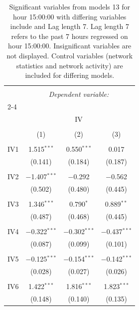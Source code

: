 
\begin{table}[!htbp] \centering 
  \caption{Significant variables from models 13 for hour 15:00:00 with differing variables include 
                               and Lag length 7. Lag length 7 refers to the past 7 hours regressed on hour 15:00:00. 
                               Insignificant variables are not displayed. 
                               Control variables (network statistics and network activity) are 
                               included for differing models.} 
  \label{IVmodels2_t_hourlagged2} 
\scriptsize 
\begin{tabular}{@{\extracolsep{5pt}}lccc} 
\\[-1.8ex]\hline 
\hline \\[-1.8ex] 
 & \multicolumn{3}{c}{\textit{Dependent variable:}} \\ 
\cline{2-4} 
\\[-1.8ex] & \multicolumn{3}{c}{IV} \\ 
\\[-1.8ex] & (1) & (2) & (3)\\ 
\hline \\[-1.8ex] 
 IV1 & 1.515$^{***}$ & 0.550$^{***}$ & 0.017 \\ 
  & (0.141) & (0.184) & (0.187) \\ 
  & & & \\ 
 IV2 & $-$1.407$^{***}$ & $-$0.292 & $-$0.562 \\ 
  & (0.502) & (0.480) & (0.445) \\ 
  & & & \\ 
 IV3 & 1.346$^{***}$ & 0.790$^{*}$ & 0.889$^{**}$ \\ 
  & (0.487) & (0.468) & (0.445) \\ 
  & & & \\ 
 IV4 & $-$0.322$^{***}$ & $-$0.302$^{***}$ & $-$0.437$^{***}$ \\ 
  & (0.087) & (0.099) & (0.101) \\ 
  & & & \\ 
 IV5 & $-$0.125$^{***}$ & $-$0.154$^{***}$ & $-$0.142$^{***}$ \\ 
  & (0.028) & (0.027) & (0.026) \\ 
  & & & \\ 
 IV6 & 1.422$^{***}$ & 1.816$^{***}$ & 1.823$^{***}$ \\ 
  & (0.148) & (0.140) & (0.135) \\ 

\end{tabular}
\end{table}
